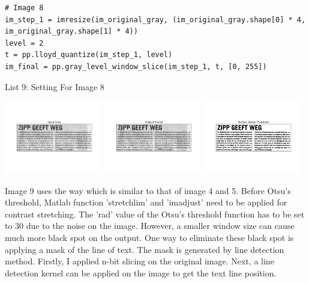 \documentclass[titlepage]{article}
\begin{document}
\begin{listing}
\begin{verbatim}
# Image 8 
im_step_1 = imresize(im_original_gray, (im_original_gray.shape[0] * 4, im_original_gray.shape[1] * 4))
level = 2
t = pp.lloyd_quantize(im_step_1, level)
im_final = pp.gray_level_window_slice(im_step_1, t, [0, 255])
\end{verbatim}
\centering
\caption{List 9: Setting For Image 8}
\newline
\end{listing}

\begin{center}
\includegraphics[width=0.32\textwidth]{img_8_gray.png}
\includegraphics[width=0.32\textwidth]{img_8_output_resize.png}
\includegraphics[width=0.32\textwidth]{img_8_output_thresh.png}
\end{center}

Image 9 uses the way which is similar to that of image 4 and 5. Before Otsu's
threshold, Matlab function 'stretchlim' and 'imadjust' need to be applied for
contrast stretching. The 'rad' value of the Otsu's threshold function has to
be set to 30 due to the noise on the image. However, a smaller window size can
cause much more black spot on the output. One way to eliminate these black
spot is applying a mask of the line of text. The mask is generated by line
detection method. Firstly, I applied n-bit slicing on the original image.
Next, a line detection kernel can be applied on the image to get the text line
position.
\end{document}
